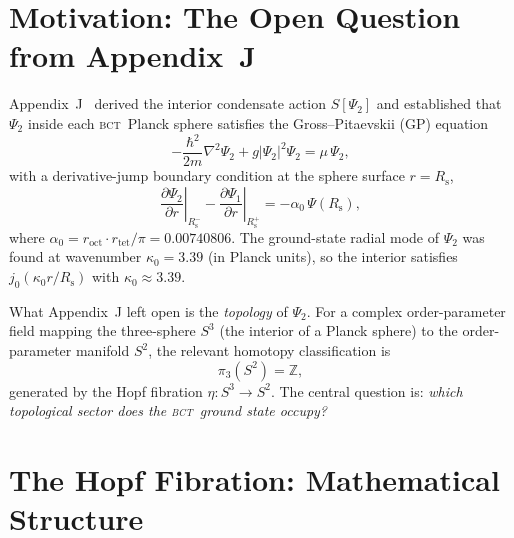 \documentclass[aps,prl,preprint,superscriptaddress,floatfix]{revtex4-2}
\newcommand{\roct}{r_{\mathrm{oct}}}
\newcommand{\rtet}{r_{\mathrm{tet}}}
\newcommand{\az}{\alpha_0}
\newcommand{\BCT}{\textsc{bct}}
\newcommand{\Psiint}{\Psi_2}
\newcommand{\Psiext}{\Psi_1}
\newcommand{\Rsph}{R_{\mathrm{s}}}
\newcommand{\kz}{\kappa_0}
\begin{document}
\maketitle

\tableofcontents

\section{Motivation: The Open Question from Appendix~J}
\label{sec:motivation}

Appendix~J~\cite{AppJ} derived the interior condensate action
$S[\Psiint]$ and established that $\Psiint$ inside each \BCT\ Planck
sphere satisfies the Gross--Pitaevskii (GP) equation
\begin{equation}
  -\frac{\hbar^2}{2m}\nabla^2\Psiint + g|\Psiint|^2\Psiint
  = \mu\,\Psiint,
  \label{eq:GP}
\end{equation}
with a derivative-jump boundary condition at the sphere surface $r=\Rsph$,
\begin{equation}
  \left.\frac{\partial\Psiint}{\partial r}\right|_{\Rsph^-}
  -
  \left.\frac{\partial\Psiext}{\partial r}\right|_{\Rsph^+}
  = -\az\,\Psi(\Rsph),
  \label{eq:BC}
\end{equation}
where $\az = \roct\cdot\rtet/\pi = 0.00740806$.
The ground-state radial mode of $\Psiint$ was found at wavenumber
$\kz = 3.39$ (in Planck units), so the interior satisfies
$j_0(\kz r/\Rsph)$ with $\kz\approx 3.39$.

What Appendix~J left open is the \emph{topology} of $\Psiint$.
For a complex order-parameter field mapping the three-sphere $S^3$ (the
interior of a Planck sphere) to the order-parameter manifold $S^2$,
the relevant homotopy classification is
\begin{equation}
  \pi_3(S^2) = \mathbb{Z},
  \label{eq:homotopy}
\end{equation}
generated by the Hopf fibration $\eta: S^3\to S^2$.
The central question is: \emph{which topological sector does the \BCT\
ground state occupy?}

\section{The Hopf Fibration: Mathematical Structure}
\label{sec:hopf}
\end{document}
